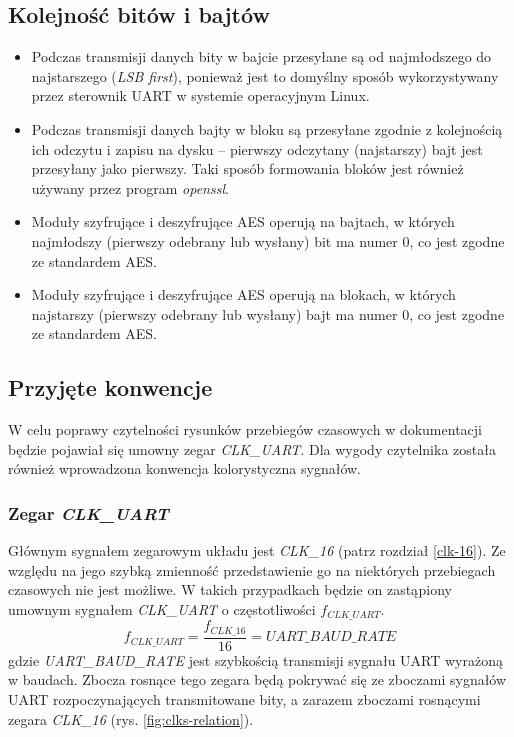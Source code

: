 \subsection{Kolejność bitów i bajtów}
\begin{itemize}
\item Podczas transmisji danych bity w bajcie przesyłane są od najmłodszego do najstarszego (\textit{LSB first}), ponieważ jest to domyślny sposób wykorzystywany przez sterownik UART w systemie operacyjnym Linux.
\item Podczas transmisji danych bajty w bloku są przesyłane zgodnie z kolejnością ich odczytu i zapisu na dysku -- pierwszy odczytany (najstarszy) bajt jest przesyłany jako pierwszy. Taki sposób formowania bloków jest również używany przez program \textit{openssl}.
\item Moduły szyfrujące i deszyfrujące AES operują na bajtach, w których najmłodszy (pierwszy odebrany lub wysłany) bit ma numer 0, co jest zgodne ze standardem AES.
\item Moduły szyfrujące i deszyfrujące AES operują na blokach, w których najstarszy (pierwszy odebrany lub wysłany) bajt ma numer 0, co jest zgodne ze standardem AES.
\end{itemize}

\subsection{Przyjęte konwencje}

W celu poprawy czytelności rysunków przebiegów czasowych w dokumentacji będzie pojawiał się umowny zegar \textit{CLK\_UART}. Dla wygody czytelnika została również wprowadzona konwencja kolorystyczna sygnałów.

\subsubsection{Zegar \textit{CLK\_UART}}
Głównym sygnałem zegarowym układu jest \textit{CLK\_16} (patrz rozdział \ref{clk-16}). Ze względu na jego szybką zmienność przedstawienie go na niektórych przebiegach czasowych nie jest możliwe. W takich przypadkach będzie on zastąpiony umownym sygnałem \textit{CLK\_UART} o częstotliwości $f_{CLK\_UART}$.
\begin{equation*}
f_{CLK\_UART} = \frac{f_{CLK\_16}}{16} = UART\_BAUD\_RATE
\label{eq:clk-uart-freq}
\end{equation*}
gdzie \textit{UART\_BAUD\_RATE} jest szybkością transmisji sygnału UART wyrażoną w baudach. Zbocza rosnące tego zegara będą pokrywać się ze zboczami sygnałów UART rozpoczynających transmitowane bity, a zarazem zboczami rosnącymi zegara \textit{CLK\_16} (rys. \ref{fig:clks-relation}). 

